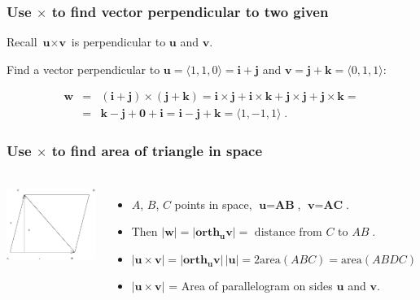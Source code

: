 \begin{frame}
\frametitle{Use $\times$ to find vector perpendicular to two given}
Recall $\textbf{u} \times \textbf{v}$ is perpendicular to $\textbf{u}$ and $\textbf{v}$.
\begin{example}
Find a vector perpendicular to $\textbf{u} =\langle1,1,0\rangle = \textbf{i}+\textbf{j}$ and $\textbf{v}=\textbf{j}+\textbf{k}=\langle 0,1,1 \rangle$:

\[
\begin{array}{rcl}
 \textbf{w} &= & (\textbf{i}+\textbf{j}) \times (\textbf{j}+\textbf{k}) =
\textbf{i} \times \textbf{j} + \textbf{i} \times \textbf{k} +
\textbf{j} \times \textbf{j} + \textbf{j} \times \textbf{k} = \\
& = & \textbf{k} -\textbf{j}+\textbf{0}+\textbf{i} = \textbf{i} - \textbf{j} + \textbf{k} = \langle1,-1,1\rangle\; .
\end{array}
\]
\end{example}
\end{frame}

\begin{frame}
\frametitle{Use $\times$ to find area of triangle in space}
\begin{columns}
  \includegraphics[height=1in]{../../modules/vectors/pictures/ok-area_triangle.eps}
\begin{itemize}
\item $A$, $B$, $C$ points in space, $\textbf{u} = \textbf{AB}$, $\textbf{v}=\textbf{AC}$. 
\item Then $|\textbf{w}| = |\textbf{orth}_{\bm{u}} \textbf{v}| = \text{ distance from } C \text{ to } AB\; .$
\item $|\textbf{u} \times \textbf{v}| = |\textbf{orth}_{\bm{u}} \textbf{v}| \, |\textbf{u}| =
2 \text{area}(ABC) = \text{area}(ABDC)$
\item $|\textbf{u} \times \textbf{v}|$ = Area of parallelogram on sides $\textbf{u}$ and $\textbf{v}$.
\end{itemize}
%
\end{columns}
\end{frame}

